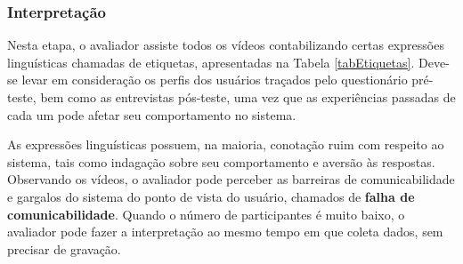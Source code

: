 \subsubsection{Interpretação}

\indent Nesta etapa, o avaliador assiste todos os vídeos contabilizando certas expressões linguísticas chamadas de etiquetas, apresentadas na Tabela \ref{tabEtiquetas}. Deve-se levar em consideração os perfis dos usuários traçados pelo questionário pré-teste, bem como as entrevistas pós-teste, uma vez que as experiências passadas de cada um pode afetar seu comportamento no sistema. 

\indent As expressões linguísticas possuem, na maioria, conotação ruim com respeito ao sistema, tais como indagação sobre seu comportamento e aversão às respostas. Observando os vídeos, o avaliador pode perceber as barreiras de comunicabilidade e gargalos do sistema do ponto de vista do usuário, chamados de \textbf{falha de comunicabilidade}. Quando o número de participantes é muito baixo, o avaliador pode fazer a interpretação ao mesmo tempo em que coleta dados, sem precisar de gravação.

